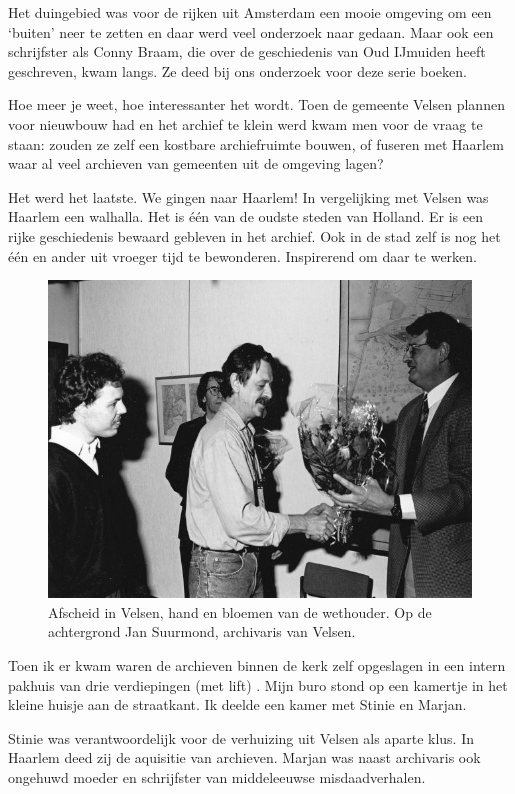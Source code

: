 \documentclass[12pt,twoside, openright]{memoir}
\begin{document}
Het duingebied was voor de rijken uit Amsterdam een mooie omgeving om een `buiten' neer te zetten en daar werd veel onderzoek naar gedaan. Maar ook een schrijfster als Conny Braam, die over de geschiedenis van Oud IJmuiden heeft geschreven, kwam langs. Ze deed bij ons onderzoek voor deze serie boeken.

Hoe meer je weet, hoe interessanter het wordt. Toen de gemeente Velsen plannen voor nieuwbouw had en het archief te klein werd kwam men voor de vraag te staan: zouden ze zelf een kostbare archiefruimte bouwen, of fuseren met Haarlem waar al veel archieven van gemeenten uit de omgeving lagen? 

Het werd het laatste. We gingen naar Haarlem! In vergelijking met Velsen was Haarlem een walhalla. Het is één van de oudste steden van Holland. Er is een rijke geschiedenis bewaard gebleven in het archief. Ook in de stad zelf is nog het één en ander uit vroeger tijd te bewonderen. Inspirerend om daar te werken. 

\begin{figure}
\centering
\includegraphics[width=\textwidth]{img/ch47/afscheid}
\caption*{\footnotesize Afscheid in Velsen, hand en bloemen van de wethouder. Op de achtergrond Jan Suurmond, archivaris van Velsen.}
\end{figure}

Toen ik er kwam waren de archieven binnen de kerk zelf opgeslagen in een intern pakhuis van drie verdiepingen (met lift) . Mijn buro stond op een kamertje in het kleine huisje aan de straatkant. Ik deelde een kamer met Stinie en Marjan.

Stinie was verantwoordelijk voor de verhuizing uit Velsen als aparte klus. In Haarlem deed zij de aquisitie van archieven. Marjan was naast archivaris ook ongehuwd moeder en schrijfster van middeleeuwse misdaadverhalen.
\end{document}

